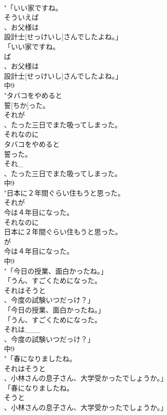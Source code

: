\documentclass[8pt]{extreport}
\begin{document}
\begin{CJK}{UTF8}{min}
\\	"「いい家ですね。
\\	そういえば
\\	、お父様は
\\	設計士[せっけいし]さんでしたよね。」
\\	「いい家ですね。
\\	ば
\\	、お父様は
\\	設計士[せっけいし]さんでしたよね。」
\\	中9
\\	"タバコをやめると
\\	誓[ちか]った。
\\	それが
\\	、たった三日でまた吸ってしまった。
\\	それなのに	
\\	タバコをやめると
\\	誓った。
\\	それ_
\\	、たった三日でまた吸ってしまった。
\\	中9
\\	"日本に２年間ぐらい住もうと思った。
\\	それが
\\	今は４年目になった。
\\	それなのに	
\\	日本に２年間ぐらい住もうと思った。
\\	が
\\	今は４年目になった。
\\	中9
\\	"「今日の授業、面白かったね。」
\\	「うん、すごくためになった。
\\	それはそうと
\\	、今度の試験いつだっけ？」
\\	「今日の授業、面白かったね。」
\\	「うん、すごくためになった。
\\	それは___
\\	、今度の試験いつだっけ？」
\\	中9
\\	"「春になりましたね。
\\	それはそうと
\\	、小林さんの息子さん、大学受かったでしょうか。」
\\	「春になりましたね。
\\	そうと
\\	、小林さんの息子さん、大学受かったでしょうか。」

\end{CJK}
\end{document}

